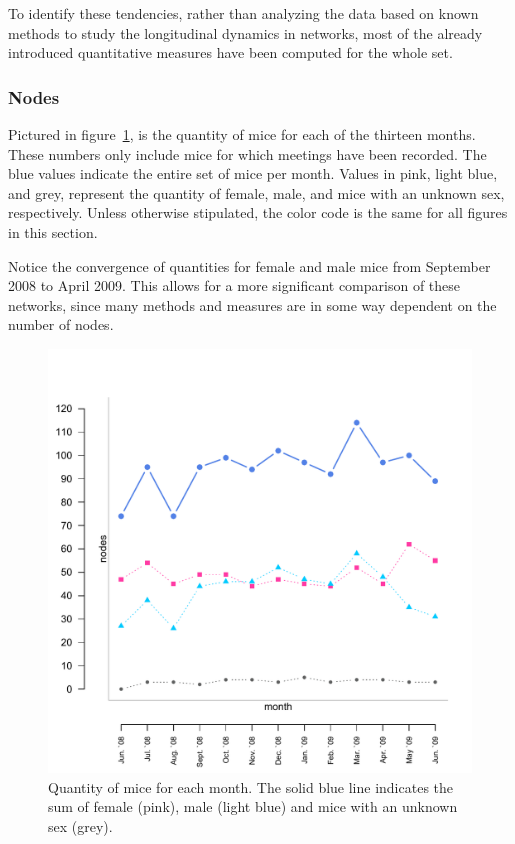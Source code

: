 To identify these tendencies, rather than analyzing the data based on known methods to study the longitudinal dynamics in networks\citep{snijders:05}, most of the already introduced quantitative measures have been computed for the whole set.

\subsubsection{Nodes}

Pictured in figure~\ref{fig:long_node}, is the quantity of mice for each of the thirteen months. These numbers only include mice for which meetings have been recorded. The blue values indicate the entire set of mice per month. Values in pink, light blue, and grey, represent the quantity of female, male, and mice with an unknown sex, respectively. Unless otherwise stipulated, the color code is the same for all figures in this section.

Notice the convergence of quantities for female and male mice from September 2008 to April 2009. This allows for a more significant comparison of these networks, since many methods and measures are in some way dependent on the number of nodes.    

\begin{figure}[htpb]
\begin{center}
  \includegraphics[width=.6\textwidth]{assets/pdf/long_nodes.pdf}
  \caption[Number of mice over the months]{Quantity of mice for each month. The solid blue line indicates the sum of female (pink), male (light blue) and mice with an unknown sex (grey).}
  \label{fig:long_node}
\end{center}
\end{figure}

\clearpage


